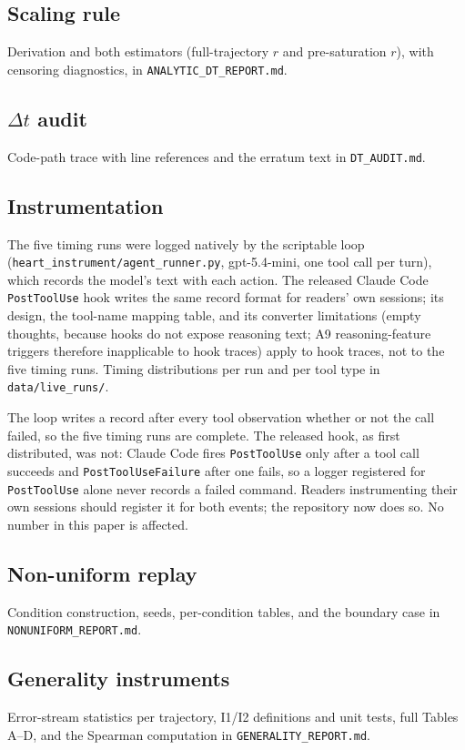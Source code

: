 \subsection{Scaling rule}
Derivation and both estimators (full-trajectory $r$ and pre-saturation $r$),
with censoring diagnostics, in \texttt{ANALYTIC\_DT\_REPORT.md}.

\subsection{$\Delta t$ audit}
Code-path trace with line references and the erratum text in
\texttt{DT\_AUDIT.md}.

\subsection{Instrumentation}
The five timing runs were logged natively by the scriptable loop
(\texttt{heart\_instrument/agent\_runner.py}, gpt-5.4-mini, one tool call per
turn), which records the model's text with each action. The released Claude Code
\texttt{PostToolUse} hook writes the same record format for readers' own
sessions; its design, the tool-name mapping table, and its converter
limitations (empty thoughts, because hooks do not expose reasoning text; A9
reasoning-feature triggers therefore inapplicable to hook traces) apply to hook
traces, not to the five timing runs. Timing distributions per run and per tool
type in \texttt{data/live\_runs/}.

The loop writes a record after every tool observation whether or not the call
failed, so the five timing runs are complete. The released hook, as first
distributed, was not: Claude Code fires \texttt{PostToolUse} only after a tool
call succeeds and \texttt{PostToolUseFailure} after one fails, so a logger
registered for \texttt{PostToolUse} alone never records a failed command.
Readers instrumenting their own sessions should register it for both events;
the repository now does so. No number in this paper is affected.

\subsection{Non-uniform replay}
Condition construction, seeds, per-condition tables, and the boundary case in
\texttt{NONUNIFORM\_REPORT.md}.

\subsection{Generality instruments}
Error-stream statistics per trajectory, I1/I2 definitions and unit tests, full
Tables A--D, and the Spearman computation in \texttt{GENERALITY\_REPORT.md}.
